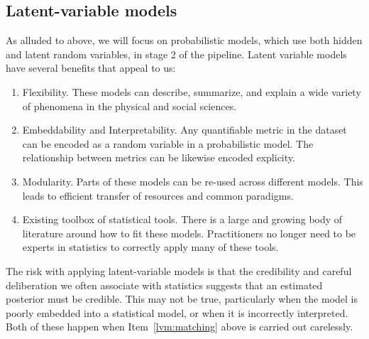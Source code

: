   \subsection{Latent-variable models}

  As alluded to above, we will focus on probabilistic models, which
  use both hidden and latent random variables, in stage 2 of the
  pipeline.  Latent variable models have several benefits that appeal
  to us:
  \begin{enumerate}
    \item Flexibility. These models can describe, summarize, and explain
    a wide variety of phenomena in the physical and social sciences.
    \item Embeddability and Interpretability.  Any quantifiable metric in the dataset
      can be encoded as a random variable in a probabilistic model.
      The relationship between metrics can be likewise encoded
      explicity. \label{lvm:matching}
    \item Modularity. Parts of these models can be re-used across
      different models.  This leads to efficient transfer of resources
      and common paradigms.
    \item Existing toolbox of statistical tools. There is a large and
      growing body of literature around how to fit these models.
      Practitioners no longer need to be experts in statistics to
      correctly apply many of these tools.
  \end{enumerate}

  The risk with applying latent-variable models is that the
  credibility and careful deliberation we often associate with
  statistics suggests that an estimated posterior must be
  credible.  This may not be true, particularly when the model is
  poorly embedded into a statistical model, or when it is incorrectly
  interpreted.  Both of these happen when Item~\ref{lvm:matching}
  above is carried out carelessly.

